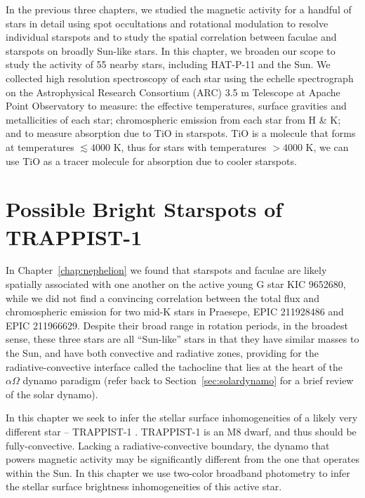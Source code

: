 \documentclass[12pt, twoside]{uwthesis}
\begin{document}
In the previous three chapters, we studied the magnetic activity for a handful of stars in detail using spot occultations and rotational modulation to resolve individual starspots and to study the spatial correlation between faculae and starspots on broadly Sun-like stars. In this chapter, we broaden our scope to study the activity of 55 nearby stars, including HAT-P-11 and the Sun. We collected high resolution spectroscopy of each star using the echelle spectrograph on the Astrophysical Research Consortium (ARC) 3.5 m Telescope at Apache Point Observatory to measure: the effective temperatures, surface gravities and metallicities of each star; chromospheric emission from each star from  H \& K; and to measure absorption due to TiO in starspots. TiO is a molecule that forms at temperatures $\lesssim 4000$ K, thus for stars with temperatures $>4000$ K, we can use TiO as a tracer molecule for absorption due to cooler starspots. 



\chapter{Possible Bright Starspots of TRAPPIST-1} \label{chap:trappist1_bright}

In Chapter~\ref{chap:nephelion} we found that starspots and faculae are likely spatially associated with one another on the active young G star KIC 9652680, while we did not find a convincing correlation between the total flux and chromospheric emission for two mid-K stars in Praesepe, EPIC 211928486 and EPIC 211966629. Despite their broad range in rotation periods, in the broadest sense, these three stars are all ``Sun-like'' stars in that they have similar masses to the Sun, and have both convective and radiative zones, providing for the radiative-convective interface called the tachocline that lies at the heart of the $\alpha\Omega$ dynamo paradigm (refer back to Section~\ref{sec:solardynamo} for a brief review of the solar dynamo). 

In this chapter we seek to infer the stellar surface inhomogeneities of a likely very different star -- TRAPPIST-1 \citep{Gillon2016,Gillon2017}. TRAPPIST-1 is an M8 dwarf, and thus should be fully-convective. Lacking a radiative-convective boundary, the dynamo that powers magnetic activity may be significantly different from the one that operates within the Sun. In this chapter we use two-color broadband photometry to infer the stellar surface brightness inhomogeneities of this active star. 
\end{document}
